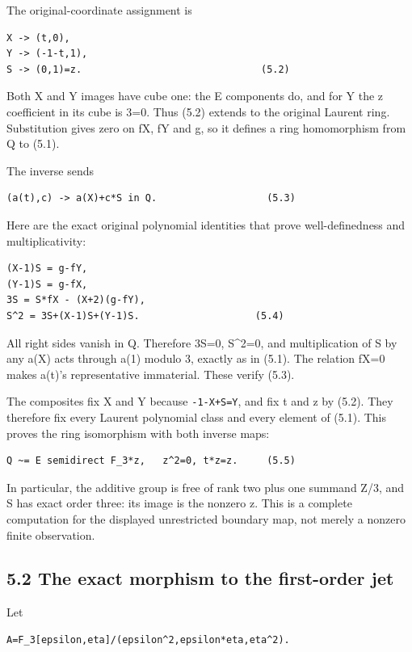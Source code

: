 \documentclass[
  10pt,
]{scrreprt}
\begin{document}
The original-coordinate assignment is

\begin{verbatim}
X -> (t,0),
Y -> (-1-t,1),
S -> (0,1)=z.                               (5.2)
\end{verbatim}

Both X and Y images have cube one: the E components do, and for Y the z
coefficient in its cube is 3=0. Thus (5.2) extends to the original
Laurent ring. Substitution gives zero on fX, fY and g, so it defines a
ring homomorphism from Q to (5.1).

The inverse sends

\begin{verbatim}
(a(t),c) -> a(X)+c*S in Q.                   (5.3)
\end{verbatim}

Here are the exact original polynomial identities that prove
well-definedness and multiplicativity:

\begin{verbatim}
(X-1)S = g-fY,
(Y-1)S = g-fX,
3S = S*fX - (X+2)(g-fY),
S^2 = 3S+(X-1)S+(Y-1)S.                    (5.4)
\end{verbatim}

All right sides vanish in Q. Therefore 3S=0, S\^{}2=0, and
multiplication of S by any a(X) acts through a(1) modulo 3, exactly as
in (5.1). The relation fX=0 makes a(t)'s representative immaterial.
These verify (5.3).

The composites fix X and Y because \texttt{-1-X+S=Y}, and fix t and z by
(5.2). They therefore fix every Laurent polynomial class and every
element of (5.1). This proves the ring isomorphism with both inverse
maps:

\begin{verbatim}
Q ~= E semidirect F_3*z,   z^2=0, t*z=z.     (5.5)
\end{verbatim}

In particular, the additive group is free of rank two plus one summand
Z/3, and S has exact order three: its image is the nonzero z. This is a
complete computation for the displayed unrestricted boundary map, not
merely a nonzero finite observation.

\subsection{5.2 The exact morphism to the first-order
jet}\label{edition-6-section-13}

Let

\begin{verbatim}
A=F_3[epsilon,eta]/(epsilon^2,epsilon*eta,eta^2).
\end{verbatim}
\end{document}
